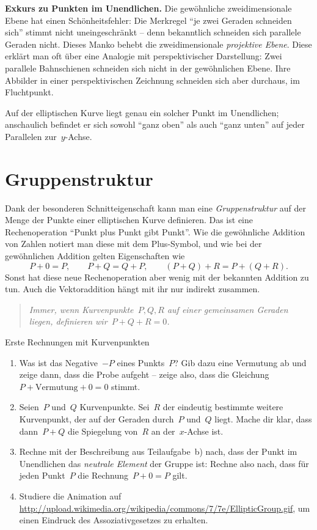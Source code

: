 \documentclass{../zirkelblatt}
\newcommand{\head}[1]{\section*{\rmfamily #1}}%
\begin{document}
\textbf{Exkurs zu Punkten im Unendlichen.} Die gewöhnliche zweidimensionale
Ebene hat einen Schönheitsfehler: Die Merkregel "`je zwei Geraden schneiden
sich"' stimmt nicht uneingeschränkt -- denn bekanntlich schneiden sich
parallele Geraden nicht. Dieses Manko behebt die zweidimensionale
\emph{projektive Ebene}. Diese erklärt man oft über eine Analogie mit
perspektivischer Darstellung: Zwei parallele Bahnschienen schneiden sich nicht
in der gewöhnlichen Ebene. Ihre Abbilder in einer perspektivischen Zeichnung
schneiden sich aber durchaus, im Fluchtpunkt.

Auf der elliptischen Kurve liegt genau ein solcher Punkt im Unendlichen;
anschaulich befindet er sich sowohl "`ganz oben"' als auch "`ganz unten"' auf
jeder Parallelen zur~$y$-Achse.


\head{Gruppenstruktur}

Dank der besonderen Schnitteigenschaft kann man eine
\emph{Gruppenstruktur} auf der Menge der Punkte einer elliptischen Kurve definieren.
Das ist eine Rechenoperation "`Punkt plus Punkt gibt Punkt"'. Wie die
gewöhnliche Addition von Zahlen notiert man diese mit dem Plus-Symbol, und wie
bei der gewöhnlichen Addition gelten Eigenschaften wie
\[ P + 0 = P, \qquad P + Q = Q + P, \qquad (P + Q) + R = P + (Q + R). \]
Sonst hat diese neue Rechenoperation aber wenig mit der bekannten Addition zu
tun. Auch die Vektoraddition hängt mit ihr nur indirekt zusammen.

\begin{quote}\emph{Immer, wenn Kurvenpunkte~$P, Q, R$ auf einer gemeinsamen Geraden
liegen, definieren wir~$P + Q + R = 0$.}
\end{quote}

\begin{aufgabeShaded}{Erste Rechnungen mit Kurvenpunkten}
\begin{enumerate}
\item Was ist das Negative~$-P$ eines Punkts~$P$? Gib dazu eine Vermutung ab
und zeige dann, dass die Probe aufgeht -- zeige also, dass die Gleichung~$P +
\text{Vermutung} + 0 = 0$ stimmt.
\item Seien~$P$ und~$Q$ Kurvenpunkte. Sei~$R$ der eindeutig bestimmte weitere
Kurvenpunkt, der auf der Geraden durch~$P$ und~$Q$ liegt. Mache dir klar, dass
dann~$P + Q$ die Spiegelung von~$R$ an der~$x$-Achse ist.
\item Rechne mit der Beschreibung aus Teilaufgabe~b) nach, dass der Punkt im
Unendlichen das \emph{neutrale Element} der Gruppe ist: Rechne also nach, dass
für jeden Punkt~$P$ die Rechnung~$P + 0 = P$ gilt.
\item Studiere die Animation auf
\url{http://upload.wikimedia.org/wikipedia/commons/7/7e/EllipticGroup.gif}, um
einen Eindruck des Assoziativgesetzes zu erhalten.
\end{enumerate}
\end{aufgabeShaded}
\end{document}
